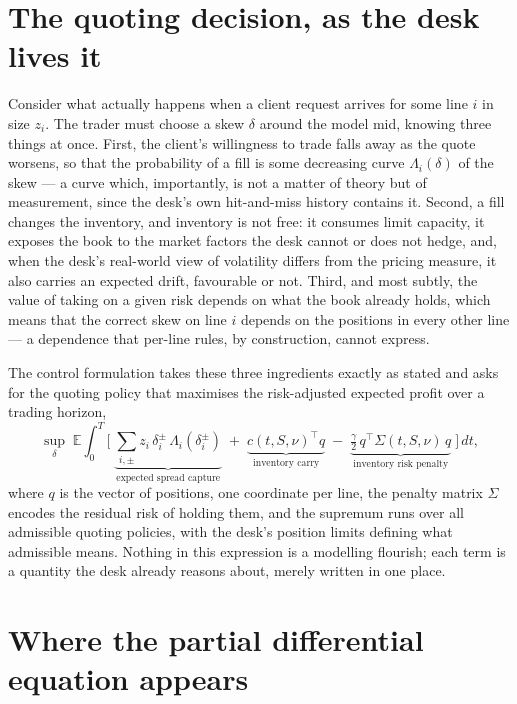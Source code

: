 \documentclass[11pt,a4paper]{article}
\newcommand{\E}{\mathbb{E}}
\begin{document}
\section{The quoting decision, as the desk lives it}

Consider what actually happens when a client request arrives for some
line $i$ in size $z_i$. The trader must choose a skew $\delta$ around the
model mid, knowing three things at once. First, the client's willingness
to trade falls away as the quote worsens, so that the probability of a
fill is some decreasing curve $\Lambda_i(\delta)$ of the skew --- a curve
which, importantly, is not a matter of theory but of measurement, since
the desk's own hit-and-miss history contains it. Second, a fill changes
the inventory, and inventory is not free: it consumes limit capacity, it
exposes the book to the market factors the desk cannot or does not hedge,
and, when the desk's real-world view of volatility differs from the
pricing measure, it also carries an expected drift, favourable or not.
Third, and most subtly, the value of taking on a given risk depends on
what the book already holds, which means that the correct skew on line
$i$ depends on the positions in every other line --- a dependence that
per-line rules, by construction, cannot express.

The control formulation takes these three ingredients exactly as stated
and asks for the quoting policy that maximises the risk-adjusted expected
profit over a trading horizon,
\begin{equation}
\sup_{\delta}\;\E\!\int_0^T\!\Big[\;
\underbrace{\textstyle\sum_{i,\pm} z_i\,\delta_i^{\pm}\,
\Lambda_i(\delta_i^{\pm})}_{\text{expected spread capture}}
\;+\;\underbrace{c(t,S,\nu)^{\!\top} q}_{\text{inventory carry}}
\;-\;\underbrace{\tfrac{\gamma}{2}\,
q^{\top}\Sigma(t,S,\nu)\,q}_{\text{inventory risk penalty}}
\;\Big]\,dt ,
\label{eq:obj}
\end{equation}
where $q$ is the vector of positions, one coordinate per line, the
penalty matrix $\Sigma$ encodes the residual risk of holding them, and
the supremum runs over all admissible quoting policies, with the desk's
position limits defining what admissible means. Nothing in this
expression is a modelling flourish; each term is a quantity the desk
already reasons about, merely written in one place.

\section{Where the partial differential equation appears}
\label{sec:pde}
\end{document}
